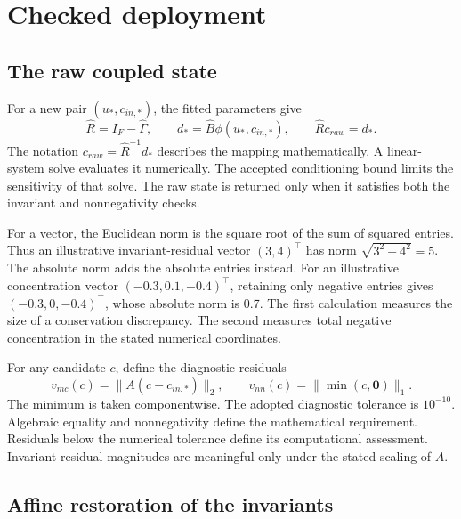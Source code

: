 \section{Checked deployment}

\subsection{The raw coupled state}

For a new pair \((u_*,c_{in,*})\), the fitted parameters give
\begin{equation}
\label{eq:icsor_raw_state}
\widehat R=I_F-\widehat\Gamma,
\qquad d_* =\widehat B\phi(u_*,c_{in,*}),
\qquad \widehat R c_{raw}=d_*.
\end{equation}
The notation \(c_{raw}=\widehat R^{-1}d_*\) describes the mapping mathematically. A linear-system solve evaluates it numerically. The accepted conditioning bound limits the sensitivity of that solve. The raw state is returned only when it satisfies both the invariant and nonnegativity checks.

For a vector, the Euclidean norm is the square root of the sum of squared entries. Thus an illustrative invariant-residual vector \((3,4)^\top\) has norm \(\sqrt{3^2+4^2}=5\). The absolute norm adds the absolute entries instead. For an illustrative concentration vector \((-0.3,0.1,-0.4)^\top\), retaining only negative entries gives \((-0.3,0,-0.4)^\top\), whose absolute norm is 0.7. The first calculation measures the size of a conservation discrepancy. The second measures total negative concentration in the stated numerical coordinates.

For any candidate \(c\), define the diagnostic residuals
\begin{equation}
\label{eq:icsor_deployment_diagnostics}
v_{mc}(c)=\|A(c-c_{in,*})\|_2,
\qquad
v_{nn}(c)=\|\min(c,\mathbf{0})\|_1.
\end{equation}
The minimum is taken componentwise. The adopted diagnostic tolerance is \(10^{-10}\). Algebraic equality and nonnegativity define the mathematical requirement. Residuals below the numerical tolerance define its computational assessment. Invariant residual magnitudes are meaningful only under the stated scaling of \(A\).

\subsection{Affine restoration of the invariants}


